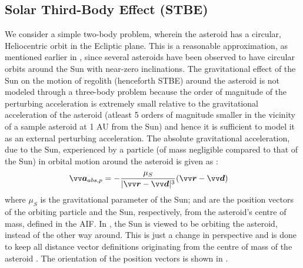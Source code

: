 \subsection{Solar Third-Body Effect (STBE)}
\label{subsec:stbe}
We consider a simple two-body problem, wherein the asteroid has a circular, Heliocentric orbit in the Ecliptic plane. This is a reasonable approximation, as mentioned earlier in , since several asteroids have been observed to have circular orbits around the Sun with near-zero inclinations. The gravitational effect of the Sun on the motion of regolith (henceforth \gls{STBE}) around the asteroid is not modeled through a three-body problem because the order of magnitude of the perturbing acceleration is extremely small relative to the gravitational acceleration of the asteroid (atleast 5 orders of magnitude smaller in the vicinity of a sample asteroid at 1 AU from the Sun) and hence it is sufficient to model it as an external perturbing acceleration.
%
\newline\newline
%
The absolute gravitational acceleration, due to the Sun, experienced by a particle (of mass negligible compared to that of the Sun) in orbital motion around the asteroid is given as \parencite{scheeresBook}:
\begin{align}
    \bv{a}_{abs, p} &= -\frac{\mu_S}{|\bv{r} - \bv{d}|^3} (\bv{r} - \bv{d})
    \label{eqn:stbe_particle_abs_acc}
\end{align}
where $\mu_S$ is the gravitational parameter of the Sun;  and  are the position vectors of the orbiting particle and the Sun, respectively, from the asteroid's centre of mass, defined in the \gls{AIF}. In , the Sun is viewed to be orbiting the asteroid, instead of the other way around. This is just a change in perspective and is done to keep all distance vector definitions originating from the centre of mass of the asteroid \parencite{scheeresBook}. The orientation of the position vectors is shown in .
